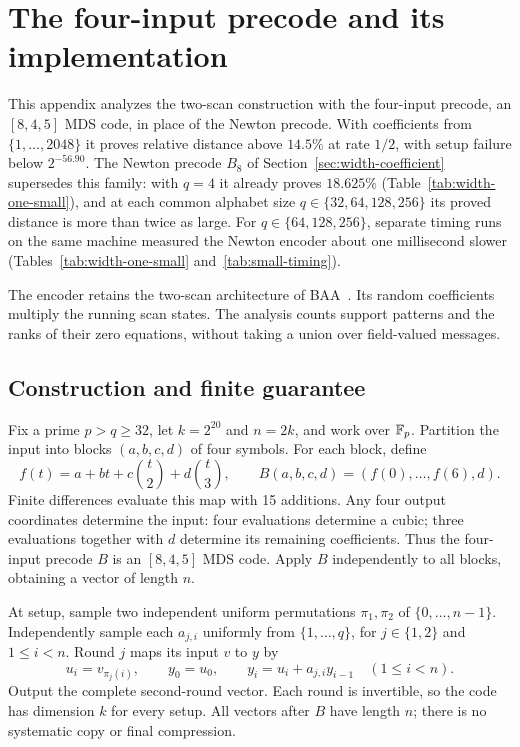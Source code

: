 \section{The four-input precode and its implementation}\label{sec:small-scans}

This appendix analyzes the two-scan construction with the four-input
precode, an $[8,4,5]$ MDS code, in place of the Newton precode. With
coefficients from $\{1,\ldots,2048\}$ it proves relative distance above
$14.5\%$ at rate $1/2$, with setup failure below $2^{-56.90}$. The
Newton precode $B_8$ of Section~\ref{sec:width-coefficient} supersedes
this family: with $q=4$ it already proves $18.625\%$
(Table~\ref{tab:width-one-small}), and at each common alphabet size
$q\in\{32,64,128,256\}$ its proved distance is more than twice as large.
For $q\in\{64,128,256\}$, separate timing runs on the same machine
measured the Newton encoder about one millisecond slower
(Tables~\ref{tab:width-one-small} and~\ref{tab:small-timing}).

The encoder retains the two-scan architecture of BAA~\cite{baa26}.
Its random coefficients multiply the running scan states. The analysis
counts support patterns and the ranks of their zero equations, without
taking a union over field-valued messages.

\subsection{Construction and finite guarantee}

Fix a prime $p>q\ge 32$, let $k=2^{20}$ and $n=2k$, and work over $\mathbb F_p$.
Partition the input into blocks $(a,b,c,d)$ of four symbols. For each block,
define
\[
 f(t)=a+bt+c\binom{t}{2}+d\binom{t}{3},\qquad
 B(a,b,c,d)=(f(0),\ldots,f(6),d).
\]
Finite differences evaluate this map with 15 additions. Any four output
coordinates determine the input: four evaluations determine a cubic;
three evaluations together with $d$ determine its remaining coefficients.
Thus the four-input precode $B$ is an $[8,4,5]$ MDS code. Apply $B$
independently to all blocks, obtaining a vector of length $n$.

At setup, sample two independent uniform permutations $\pi_1,\pi_2$ of
$\{0,\ldots,n-1\}$. Independently sample each $a_{j,i}$ uniformly from
$\{1,\ldots,q\}$, for $j\in\{1,2\}$ and $1\le i<n$. Round $j$ maps its
input $v$ to $y$ by
\begin{equation}\label{eq:small-scan}
 u_i=v_{\pi_j(i)},\qquad y_0=u_0,\qquad
 y_i=u_i+a_{j,i}y_{i-1}\quad(1\le i<n).
\end{equation}
Output the complete second-round vector. Each round is invertible, so
the code has dimension $k$ for every setup. All vectors after $B$ have
length $n$; there is no systematic copy or final compression.

